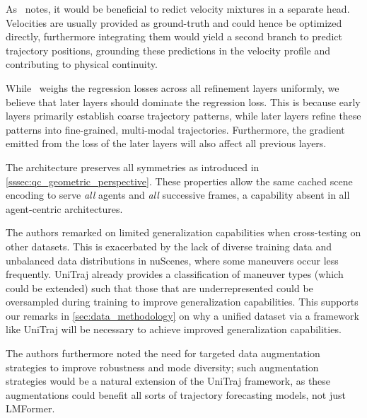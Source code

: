 \begin{description}[itemsep=0.5em]


\item[\textbf{Velocity-Position Decoupling and Optimization}]
As~\cite{lmformerYadav2025} notes, it would be beneficial to redict velocity mixtures in a separate head. Velocities are usually provided as ground-truth and could hence be optimized directly, furthermore integrating them would yield a second branch to predict trajectory positions, grounding these predictions in the velocity profile and contributing to physical continuity.

While~\cite{lmformerYadav2025} weighs the regression losses across all refinement layers uniformly, we believe that later layers should dominate the regression loss. This is because early layers primarily establish coarse trajectory patterns, while later layers refine these patterns into fine-grained, multi-modal trajectories. Furthermore, the gradient emitted from the loss of the later layers will also affect all previous layers.

\item[\textbf{Geometric Symmetries \& Multi-Agent Capabilities}]
The architecture preserves all symmetries as introduced in \autoref{sssec:qc_geometric_perspective}. These properties allow the same cached scene encoding to serve \emph{all} agents and \emph{all} successive frames, a capability absent in all agent-centric architectures.



\item[\textbf{Generalization \& Data Diversity}]
The authors remarked on limited generalization capabilities when cross-testing on other datasets. This is exacerbated by the lack of diverse training data and unbalanced data distributions in nuScenes, where some maneuvers occur less frequently. UniTraj already provides a classification of maneuver types (which could be extended) such that those that are underrepresented could be oversampled during training to improve generalization capabilities. This supports our remarks in \autoref{sec:data_methodology} on why a unified dataset via a framework like UniTraj will be necessary to achieve improved generalization capabilities.

The authors furthermore noted the need for targeted data augmentation strategies to improve robustness and mode diversity; such augmentation strategies would be a natural extension of the UniTraj framework, as these augmentations could benefit all sorts of trajectory forecasting models, not just LMFormer.

\end{description}

